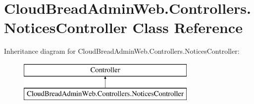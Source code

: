 \hypertarget{a00169}{}\section{Cloud\+Bread\+Admin\+Web.\+Controllers.\+Notices\+Controller Class Reference}
\label{a00169}
Inheritance diagram for Cloud\+Bread\+Admin\+Web.\+Controllers.\+Notices\+Controller\+:\begin{figure}[H]
\begin{center}
\leavevmode
\includegraphics[height=2.000000cm]{a00169}
\end{center}
\end{figure}
